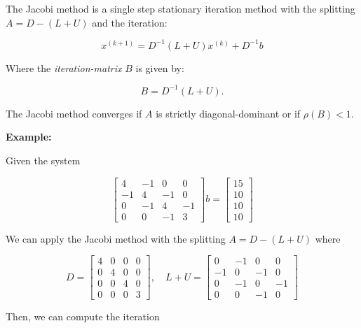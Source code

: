 The Jacobi method is a single step stationary iteration method with the splitting 
\(A = D - (L + U)\) and the iteration:

\[
    x^{(k + 1)} = D^{-1}(L + U)x^{(k)} + D^{-1}b
\]

Where the \emph{iteration-matrix} \(B\) is given by: 

\[
    B = D^{-1}(L + U).
\]

The Jacobi method converges if \(A\) is strictly diagonal-dominant or if \(\rho(B) < 1\).

\textbf{Example:}

Given the system 

\[
    \begin{bmatrix}
        4 & -1 & 0 & 0 \\ 
        -1 & 4 & -1 & 0 \\ 
        0 & -1 & 4 & -1 \\ 
        0 & 0 & -1 & 3
    \end{bmatrix}
    b = 
    \begin{bmatrix}
        15 \\ 
        10 \\ 
        10 \\ 
        10
    \end{bmatrix}
\]

We can apply the Jacobi method with the splitting \(A = D - (L + U)\) where

\[
    D = 
    \begin{bmatrix}
        4 & 0 & 0 & 0 \\ 
        0 & 4 & 0 & 0 \\ 
        0 & 0 & 4 & 0 \\ 
        0 & 0 & 0 & 3
    \end{bmatrix}
    , \quad 
    L + U = 
    \begin{bmatrix}
        0 & -1 & 0 & 0 \\ 
        -1 & 0 & -1 & 0 \\ 
        0 & -1 & 0 & -1 \\ 
        0 & 0 & -1 & 0
    \end{bmatrix}
\]

Then, we can compute the iteration

